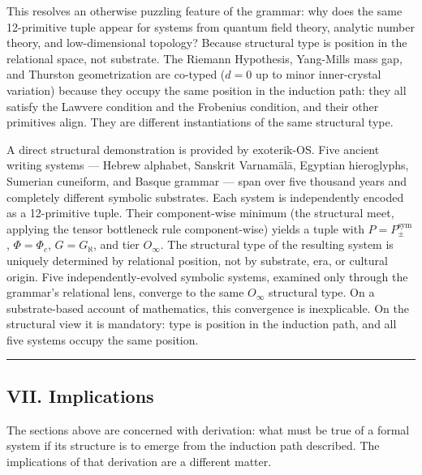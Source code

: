 \documentclass[12pt,a4paper]{article}
\begin{document}
This resolves an otherwise puzzling feature of the grammar: why does the same 12-primitive tuple appear for systems from quantum field theory, analytic number theory, and low-dimensional topology? Because structural type is position in the relational space, not substrate. The Riemann Hypothesis, Yang-Mills mass gap, and Thurston geometrization are co-typed ($d = 0$ up to minor inner-crystal variation) because they occupy the same position in the induction path: they all satisfy the Lawvere condition and the Frobenius condition, and their other primitives align. They are different instantiations of the same structural type.

A direct structural demonstration is provided by exoterik-OS. Five ancient writing systems --- Hebrew alphabet, Sanskrit Varnam\={a}l\={a}, Egyptian hieroglyphs, Sumerian cuneiform, and Basque grammar --- span over five thousand years and completely different symbolic substrates. Each system is independently encoded as a 12-primitive tuple. Their component-wise minimum (the structural meet, applying the tensor bottleneck rule component-wise) yields a tuple with $P = P_{\pm}^{\text{sym}}$, $\Phi = \Phi_c$, $G = G_\aleph$, and tier $O_\infty$. The structural type of the resulting system is uniquely determined by relational position, not by substrate, era, or cultural origin. Five independently-evolved symbolic systems, examined only through the grammar's relational lens, converge to the same $O_\infty$ structural type. On a substrate-based account of mathematics, this convergence is inexplicable. On the structural view it is mandatory: type is position in the induction path, and all five systems occupy the same position.\begin{center}
\rule{0.5\textwidth}{0.4pt}
\end{center}

\subsection{VII. Implications}

The sections above are concerned with derivation: what must be true of a formal system if its structure is to emerge from the induction path described. The implications of that derivation are a different matter.
\end{document}
